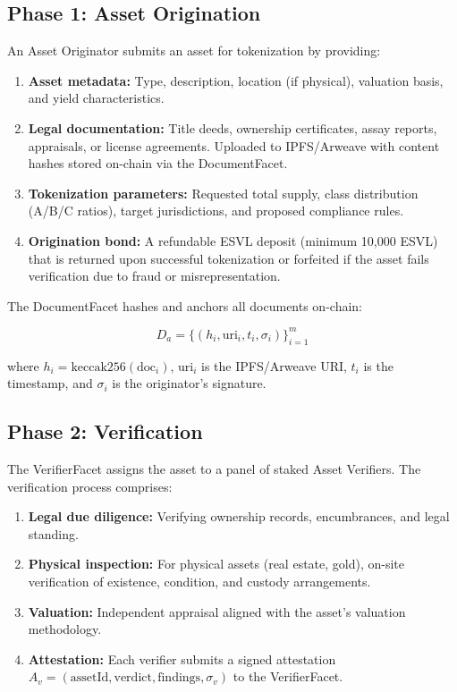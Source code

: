 \documentclass[11pt,a4paper]{article}
\begin{document}
\subsection{Phase 1: Asset Origination}

An Asset Originator submits an asset for tokenization by providing:

\begin{enumerate}[nosep]
    \item \textbf{Asset metadata:} Type, description, location (if physical), valuation basis, and yield characteristics.
    \item \textbf{Legal documentation:} Title deeds, ownership certificates, assay reports, appraisals, or license agreements. Uploaded to IPFS/Arweave with content hashes stored on-chain via the DocumentFacet.
    \item \textbf{Tokenization parameters:} Requested total supply, class distribution (A/B/C ratios), target jurisdictions, and proposed compliance rules.
    \item \textbf{Origination bond:} A refundable ESVL deposit (minimum 10,000 ESVL) that is returned upon successful tokenization or forfeited if the asset fails verification due to fraud or misrepresentation.
\end{enumerate}

The DocumentFacet hashes and anchors all documents on-chain:

\begin{equation}
    D_a = \{(h_i, \text{uri}_i, t_i, \sigma_i)\}_{i=1}^{m}
\end{equation}

\noindent where $h_i = \text{keccak256}(\text{doc}_i)$, $\text{uri}_i$ is the IPFS/Arweave URI, $t_i$ is the timestamp, and $\sigma_i$ is the originator's signature.

\subsection{Phase 2: Verification}

The VerifierFacet assigns the asset to a panel of staked Asset Verifiers. The verification process comprises:

\begin{enumerate}[nosep]
    \item \textbf{Legal due diligence:} Verifying ownership records, encumbrances, and legal standing.
    \item \textbf{Physical inspection:} For physical assets (real estate, gold), on-site verification of existence, condition, and custody arrangements.
    \item \textbf{Valuation:} Independent appraisal aligned with the asset's valuation methodology.
    \item \textbf{Attestation:} Each verifier submits a signed attestation $A_v = (\text{assetId}, \text{verdict}, \text{findings}, \sigma_v)$ to the VerifierFacet.
\end{enumerate}
\end{document}

